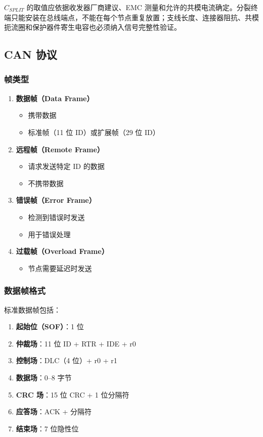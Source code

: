 $C_{SPLIT}$ 的取值应依据收发器厂商建议、EMC 测量和允许的共模电流确定。分裂终端只能安装在总线端点，不能在每个节点重复放置；支线长度、连接器阻抗、共模扼流圈和保护器件寄生电容也必须纳入信号完整性验证。

\subsection{CAN 协议}

\subsubsection{帧类型}

\begin{enumerate}
  \item \textbf{数据帧（Data Frame）}
    \begin{itemize}
      \item 携带数据
      \item 标准帧（11 位 ID）或扩展帧（29 位 ID）
    \end{itemize}

  \item \textbf{远程帧（Remote Frame）}
    \begin{itemize}
      \item 请求发送特定 ID 的数据
      \item 不携带数据
    \end{itemize}

  \item \textbf{错误帧（Error Frame）}
    \begin{itemize}
      \item 检测到错误时发送
      \item 用于错误处理
    \end{itemize}

  \item \textbf{过载帧（Overload Frame）}
    \begin{itemize}
      \item 节点需要延迟时发送
    \end{itemize}
\end{enumerate}

\subsubsection{数据帧格式}

标准数据帧包括：
\begin{enumerate}
  \item \textbf{起始位（SOF）}：1 位
  \item \textbf{仲裁场}：11 位 ID + RTR + IDE + r0
  \item \textbf{控制场}：DLC（4 位）+ r0 + r1
  \item \textbf{数据场}：0--8 字节
  \item \textbf{CRC 场}：15 位 CRC + 1 位分隔符
  \item \textbf{应答场}：ACK + 分隔符
  \item \textbf{结束场}：7 位隐性位
\end{enumerate}

